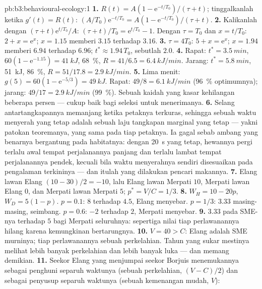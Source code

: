 \begin{solution}{pb:b3:behavioural-ecology:1}
\textbf{1.} $R(t) = A(1 - \mathrm{e}^{-t/T_{0}})/(\tau + t)$; tinggalkanlah ketika
$g'(t) = R(t)$: $(A/T_{0})\mathrm{e}^{-t/T_{0}} = A(1 - \mathrm{e}^{-t/T_{0}})/
(\tau + t)$.
\textbf{2.} Kalikanlah dengan $(\tau + t)\mathrm{e}^{t/T_{0}}/A$: $(\tau + t)/T_{0}
= \mathrm{e}^{t/T_{0}} - 1$. Dengan $\tau = T_{0}$ dan $x = t/T_{0}$: $2 + x =
\mathrm{e}^{x}$; $x = 1.15$ memberi $3.15$ terhadap $3.16$.
\textbf{3.} $\tau = 4T_{0}$: $5 + x = \mathrm{e}^{x}$; $x = 1.94$ memberi
$6.94$ terhadap $6.96$; $t^{*} \approx 1.94\,T_{0}$, sebutlah $2.0$.
\textbf{4.} Rapat: $t^{*} = \qty{3.5}{min}$, $60(1 - \mathrm{e}^{-1.15}) =
\qty{41}{kJ}$, \qty{68}{\%}, $R = 41/6.5 = \qty{6.4}{kJ/min}$. Jarang:
$t^{*} = \qty{5.8}{min}$, \qty{51}{kJ}, \qty{86}{\%}, $R = 51/17.8 =
\qty{2.9}{kJ/min}$.
\textbf{5.} Lima menit: $g(5) = 60(1 - \mathrm{e}^{-5/3}) = \qty{49}{kJ}$.
Rapat: $49/8 = \qty{6.1}{kJ/min}$ (\qty{96}{\%} optimumnya); jarang:
$49/17 = \qty{2.9}{kJ/min}$ (\qty{99}{\%}). Sebuah kaidah yang kasar kehilangan beberapa
persen --- cukup baik bagi seleksi untuk menerimanya.
\textbf{6.} Selang antartangkapannya memanjang ketika petaknya
terkuras, sehingga sebuah waktu menyerah yang tetap adalah sebuah laju tangkapan marginal yang tetap
--- yakni patokan teoremanya, yang sama pada tiap petaknya. Ia gagal
sebab ambang yang benarnya bergantung pada habitatnya: dengan \qty{20}{s} yang
tetap, hewannya pergi terlalu awal tempat perjalanannya panjang dan terlalu
lambat tempat perjalanannya pendek, kecuali bila waktu menyerahnya sendiri disesuaikan
pada pengalaman terkininya --- dan itulah yang dilakukan pencari makannya.
\textbf{7.} Elang lawan Elang $(10 - 30)/2 = -10$, lalu Elang lawan Merpati $10$,
Merpati lawan Elang $0$, dan Merpati lawan Merpati $5$; $p^{*} = V/C = 1/3$.
\textbf{8.} $W_{H} = 10 - 20p$, $W_{D} = 5(1 - p)$. $p = 0.1$: $8$ terhadap
$4.5$, Elang menyebar. $p = 1/3$: $3.33$ masing-masing, seimbang. $p = 0.6$: $-2$
terhadap $2$, Merpati menyebar.
\textbf{9.} $3.33$ pada SME-nya terhadap $5$ bagi Merpati seluruhnya: sepertiga
nilai tiap perlawanannya hilang karena kemungkinan bertarungnya.
\textbf{10.} $V = 40 > C$: Elang adalah SME murninya; tiap perlawanannya sebuah perkelahian.
Tahun yang sukar mestinya melihat lebih banyak perkelahian dan lebih banyak luka --- dan memang demikian.
\textbf{11.} Seekor Elang yang menjumpai seekor Borjuis menemukannya sebagai penghuni separuh waktunya
(sebuah perkelahian, $(V - C)/2$) dan sebagai penyusup separuh waktunya (sebuah kemenangan mudah, $V$):

\end{solution}
